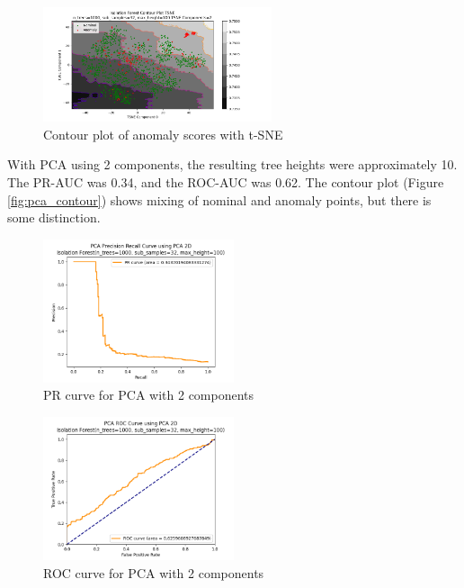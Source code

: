 \begin{figure}[htbp]
\centering
\includegraphics[width=0.6\textwidth]{resources/images/_TSNE_contour_plot.png}
\caption{Contour plot of anomaly scores with t-SNE}
\label{fig:tsne_contour}
\end{figure}

With PCA using 2 components, the resulting tree heights were approximately 10. The PR-AUC was 0.34, and the ROC-AUC was 0.62. The contour plot (Figure \ref{fig:pca_contour}) shows mixing of nominal and anomaly points, but there is some distinction.

\begin{figure}[htbp]
\centering
\includegraphics[width=0.5\textwidth]{resources/images/pca_pr_curve.png}
\caption{PR curve for PCA with 2 components}
\label{fig:pca_pr}
\end{figure}

\begin{figure}[htbp]
\centering
\includegraphics[width=0.5\textwidth]{resources/images/pca_roc_curve.png}
\caption{ROC curve for PCA with 2 components}
\label{fig:pca_roc}
\end{figure}

